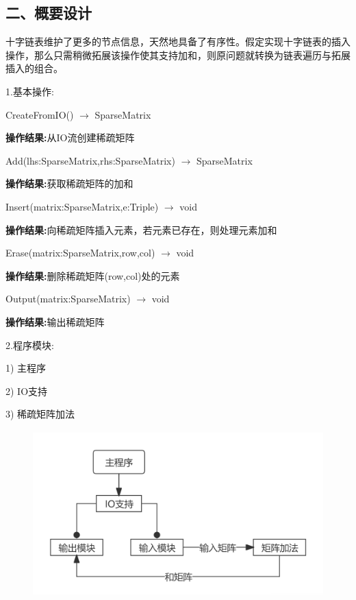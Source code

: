 \documentclass[UTF8, a4paper]{ctexart}
\begin{document}
\subsection*{二、概要设计}
十字链表维护了更多的节点信息，天然地具备了有序性。假定实现十字链表的插入操作，那么只需稍微拓展该操作使其支持加和，则原问题就转换为链表遍历与拓展插入的组合。 \par
1.\;基本操作: \par
	CreateFromIO() $\rightarrow$ SparseMatrix \par
	\qquad\textbf{操作结果:}\;从IO流创建稀疏矩阵 \par
	Add(lhs:SparseMatrix,rhs:SparseMatrix) $\rightarrow$ SparseMatrix \par
	\qquad\textbf{操作结果:}\;获取稀疏矩阵的加和 \par
	Insert(matrix:SparseMatrix,e:Triple) $\rightarrow$ void \par
	\qquad\textbf{操作结果:}\;向稀疏矩阵插入元素，若元素已存在，则处理元素加和 \par
	Erase(matrix:SparseMatrix,row,col) $\rightarrow$ void \par
	\qquad\textbf{操作结果:}\;删除稀疏矩阵(row,col)处的元素 \par
	Output(matrix:SparseMatrix) $\rightarrow$ void \par
	\qquad\textbf{操作结果:}\;输出稀疏矩阵 \par
2.\;程序模块: \par
1) 主程序 \par
2) IO支持 \par
3) 稀疏矩阵加法 \par
\begin{figure}[H]
	\begin{minipage}[t]{\linewidth}
		\centering
		\includegraphics[width=125mm,height=64mm]{./assets/DS05-1}
	\end{minipage}
\end{figure}
\end{document}
